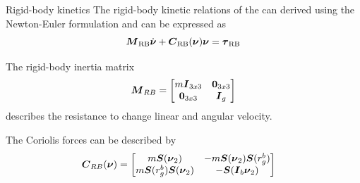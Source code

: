 \documentclass[11pt,aspectratio=169]{beamer}
\begin{document}
\begin{frame}{Rigid-body kinetics}
The rigid-body kinetic relations of the \abbrROV can derived using the Newton-Euler formulation and can be expressed as
\begin{equation}\label{eq:rb}
\boldsymbol{M}_{\text{RB}}\dot{\boldsymbol{\nu}} + \boldsymbol{C}_{\text{RB}}(\boldsymbol{\nu})\boldsymbol{\nu} = \boldsymbol{\tau}_{\text{RB}}
\end{equation}

The rigid-body inertia matrix
\begin{equation}
   \boldsymbol{M}_{RB} = 
    \begin{bmatrix}
        m\boldsymbol{I}_{3x3} & \boldsymbol{0}_{3x3} \\
        \boldsymbol{0}_{3x3} & \boldsymbol{I}_{g}
    \end{bmatrix}
\end{equation}
describes the resistance to change linear and angular velocity.

The Coriolis forces can be described by
\begin{equation}
\begin{split}
    \boldsymbol{C}_{RB}(\boldsymbol{\nu}) &= 
    \begin{bmatrix}
        m\boldsymbol{S}(\boldsymbol{\nu}_{2})              & -m\boldsymbol{S}(\boldsymbol{\nu}_{2})\boldsymbol{S}(r_g^b)  \\
        m\boldsymbol{S}(r_g^b)\boldsymbol{S}(\boldsymbol{\nu}_{2}) & -\boldsymbol{S}(\boldsymbol{I}_{b}\boldsymbol{\nu}_{2}) \\
    \end{bmatrix}
\end{split}
\end{equation}
\end{frame}
\end{document}
